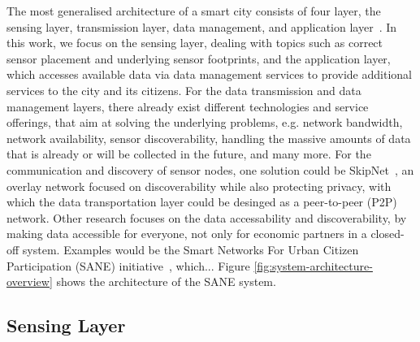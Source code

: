  The most generalised architecture of a smart city consists of four layer, the sensing layer, transmission layer, data management, and application layer~\cite{silva2018towards}. In this work, we focus on the sensing layer, dealing with topics such as correct sensor placement and underlying sensor footprints, and the application layer, which accesses available data via data management services to provide additional services to the city and its citizens. For the data transmission and data management layers, there already exist different technologies and service offerings, that aim at solving the underlying problems, e.g. network bandwidth, network availability, sensor discoverability, handling the massive amounts of data that is already or will be collected in the future, and many more. For the communication and discovery of sensor nodes, one solution could be SkipNet~\cite{harvey2002skipnet}, an overlay network focused on discoverability while also protecting privacy, with which the data transportation layer could be desinged as a peer-to-peer (P2P) network. Other research focuses on the data accessability and discoverability, by making data accessible for everyone, not only for economic partners in a closed-off system. Examples would be the Smart Networks For Urban Citizen Participation (SANE) initiative~\cite{bornholdt2019sane}, which... Figure \ref{fig:system-architecture-overview} shows the architecture of the SANE system.


\subsection{Sensing Layer}


